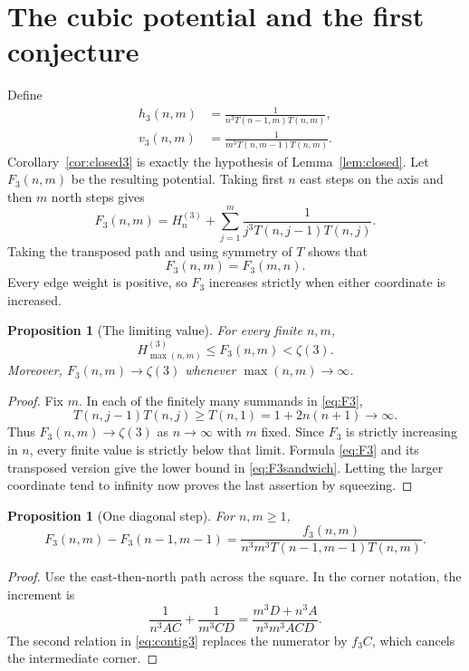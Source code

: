 \documentclass[11pt]{article}
\numberwithin{equation}{section}
\newtheorem{proposition}[theorem]{Proposition}
\theoremstyle{definition}
\theoremstyle{remark}
\newcommand{\HS}[2]{H_{#1}^{(#2)}}
\begin{document}
\section{The cubic potential and the first conjecture}\label{sec:proof3}

Define
\begin{align}
 h_3(n,m)&=\frac1{n^3T(n-1,m)T(n,m)},\label{eq:h3}\\
 v_3(n,m)&=\frac1{m^3T(n,m-1)T(n,m)}.\label{eq:v3}
\end{align}
Corollary~\ref{cor:closed3} is exactly the hypothesis of
Lemma~\ref{lem:closed}. Let $F_3(n,m)$ be the resulting potential.
Taking first $n$ east steps on the axis and then $m$ north steps gives
\begin{equation}\label{eq:F3}
 F_3(n,m)=\HS{n}{3}+
 \sum_{j=1}^m\frac1{j^3T(n,j-1)T(n,j)}.
\end{equation}
Taking the transposed path and using symmetry of $T$ shows that
\begin{equation}\label{eq:F3sym}
 F_3(n,m)=F_3(m,n).
\end{equation}
Every edge weight is positive, so $F_3$ increases strictly when either
coordinate is increased.

\begin{proposition}[The limiting value]\label{prop:limit3}
For every finite $n,m$,
\begin{equation}\label{eq:F3sandwich}
 \HS{\max(n,m)}{3}\leq F_3(n,m)<\zeta(3).
\end{equation}
Moreover, $F_3(n,m)\to\zeta(3)$ whenever $\max(n,m)\to\infty$.
\end{proposition}
\begin{proof}
Fix $m$. In each of the finitely many summands in \eqref{eq:F3},
\[
 T(n,j-1)T(n,j)\geq T(n,1)=1+2n(n+1)\longrightarrow\infty.
\]
Thus $F_3(n,m)\to\zeta(3)$ as $n\to\infty$ with $m$ fixed.
Since $F_3$ is strictly increasing in $n$, every finite value is strictly
below that limit. Formula \eqref{eq:F3} and its transposed version give
the lower bound in \eqref{eq:F3sandwich}. Letting the larger coordinate
tend to infinity now proves the last assertion by squeezing.
\end{proof}

\begin{proposition}[One diagonal step]\label{prop:step3}
For $n,m\geq1$,
\begin{equation}\label{eq:step3}
 F_3(n,m)-F_3(n-1,m-1)
 =\frac{f_3(n,m)}
 {n^3m^3T(n-1,m-1)T(n,m)}.
\end{equation}
\end{proposition}
\begin{proof}
Use the east-then-north path across the square. In the corner notation,
the increment is
\[
 \frac1{n^3AC}+\frac1{m^3CD}
 =\frac{m^3D+n^3A}{n^3m^3ACD}.
\]
The second relation in \eqref{eq:contig3} replaces the numerator by $f_3C$,
which cancels the intermediate corner.
\end{proof}
\end{document}
